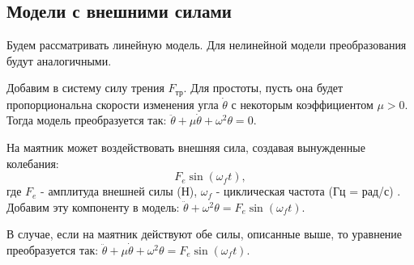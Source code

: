 \subsection*{Модели с внешними силами}
Будем рассматривать линейную модель. Для нелинейной модели преобразования будут аналогичными.

Добавим в систему силу трения $F_{\text{тр}}$. Для простоты, пусть она будет пропорциональна скорости  изменения угла $\dot{\theta}$ с некоторым коэффициентом $\mu > 0$. Тогда модель преобразуется так: $\ddot{\theta} + \mu\dot{\theta} + \omega^2 \theta = 0 $.

На маятник может воздействовать внешняя сила, создавая вынужденные колебания: $$F_e\sin(\omega_f t),$$ где $F_e$ - амплитуда внешней силы (Н), $\omega_f$ - циклическая частота (Гц = рад/с) . Добавим эту компоненту в модель: $\ddot{\theta}  + \omega^2 \theta = F_e\sin(\omega_f t) $.

В случае, если на маятник действуют обе силы, описанные выше, то уравнение преобразуется так: $\ddot{\theta} + \mu \dot{\theta}  + \omega^2 \theta = F_e\sin(\omega_f t) $.



 
 
 
